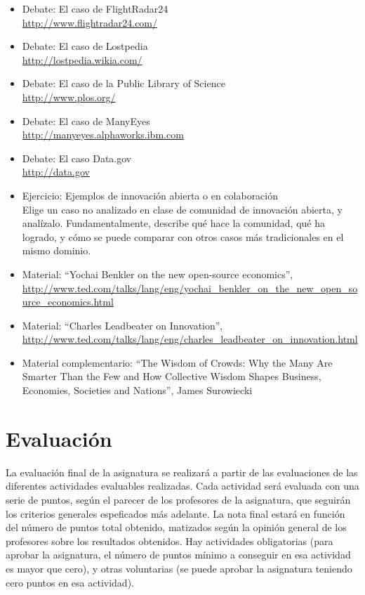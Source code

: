 \documentclass[a4paper,12pt]{article}
\begin{document}
\begin{itemize}
\begin{itemize}
  \end{itemize}
\item Debate: El caso de FlightRadar24 \\
  \url{http://www.flightradar24.com/}
\item Debate: El caso de Lostpedia \\
  \url{http://lostpedia.wikia.com/}
\item Debate: El caso de la Public Library of Science \\
  \url{http://www.plos.org/}
\item Debate: El caso de ManyEyes \\
  \url{http://manyeyes.alphaworks.ibm.com}
\item Debate: El caso Data.gov \\
  \url{http://data.gov}
\item Ejercicio: Ejemplos de innovación abierta o en colaboración \\
  Elige un caso no analizado en clase de comunidad de innovación abierta, y analízalo. Fundamentalmente, describe qué hace la comunidad, qué ha logrado, y cómo se puede comparar con otros casos más tradicionales en el mismo dominio.
\item Material: ``Yochai Benkler on the new open-source economics'', \\
  \url{http://www.ted.com/talks/lang/eng/yochai_benkler_on_the_new_open_source_economics.html}
\item Material: ``Charles Leadbeater on Innovation'', \\
  \url{http://www.ted.com/talks/lang/eng/charles_leadbeater_on_innovation.html}
\item Material complementario: ``The Wisdom of Crowds: Why the Many Are Smarter Than the Few and How Collective Wisdom Shapes Business, Economies, Societies and Nations'', James Surowiecki
\end{itemize}


\section{Evaluación}

La evaluación final de la asignatura se realizará a partir de las evaluaciones de las diferentes actividades evaluables realizadas. Cada actividad será evaluada con una serie de puntos, según el parecer de los profesores de la asignatura, que seguirán los criterios generales espeficados más adelante. La nota final estará en función del número de puntos total obtenido, matizados según la opinión general de los profesores sobre los resultados obtenidos. Hay actividades obligatorias (para aprobar la asignatura, el número de puntos mínimo a conseguir en esa actividad es mayor que cero), y otras voluntarias (se puede aprobar la asignatura teniendo cero puntos en esa actividad).
\end{document}
